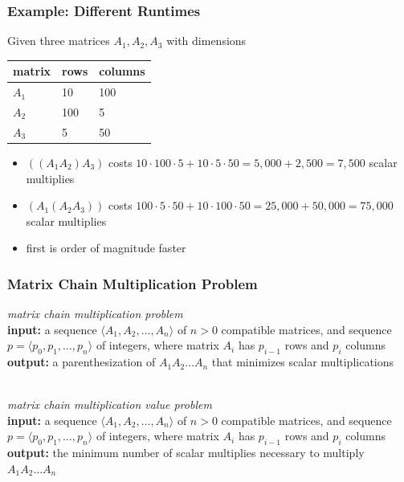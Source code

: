 \documentclass{beamer}
\newcommand{\stanza}{ \\~\ }
\begin{document}
\begin{frame} \frametitle{Example: Different Runtimes}
Given three matrices $A_1, A_2, A_3$ with dimensions
\begin{center}
  \begin{tabular}{l|ll}
    matrix & rows & columns \\ \hline
    $A_1$ & 10 & 100 \\
    $A_2$ & 100 & 5 \\
    $A_3$ & 5 & 50
  \end{tabular}
\end{center}
\begin{itemize}
  \item $((A_1 A_2)A_3)$ costs $10 \cdot 100 \cdot 5 + 10 \cdot 5 \cdot 50= 5,000+2,500 = 7,500$ scalar multiplies
  \item $(A_1 (A_2 A_3))$ costs $100 \cdot 5 \cdot 50 + 10 \cdot 100 \cdot 50 = 25,000 + 50,000 = 75,000$ scalar multiplies
  \item first is order of magnitude faster
\end{itemize}
\end{frame}

\begin{frame} \frametitle{Matrix Chain Multiplication Problem}
  \emph{matrix chain multiplication problem} \\
  \textbf{input:} a sequence $\langle A_1, A_2, \ldots, A_n \rangle$ of $n>0$ compatible matrices,
    and sequence $p=\langle p_0, p_1, \ldots, p_n \rangle$ of integers, where
    matrix $A_i$ has $p_{i-1}$ rows and $p_i$ columns \\
  \textbf{output:} a parenthesization of $A_1 A_2 \ldots A_n$ that minimizes scalar multiplications
  \stanza

  \emph{matrix chain multiplication value problem} \\
  \textbf{input:} a sequence $\langle A_1, A_2, \ldots, A_n \rangle$ of $n>0$ compatible matrices,
    and sequence $p=\langle p_0, p_1, \ldots, p_n \rangle$ of integers, where
    matrix $A_i$ has $p_{i-1}$ rows and $p_i$ columns \\
  \textbf{output:} the minimum number of scalar multiplies necessary to multiply $A_1 A_2 \ldots A_n$ 
\end{frame}
\end{document}
